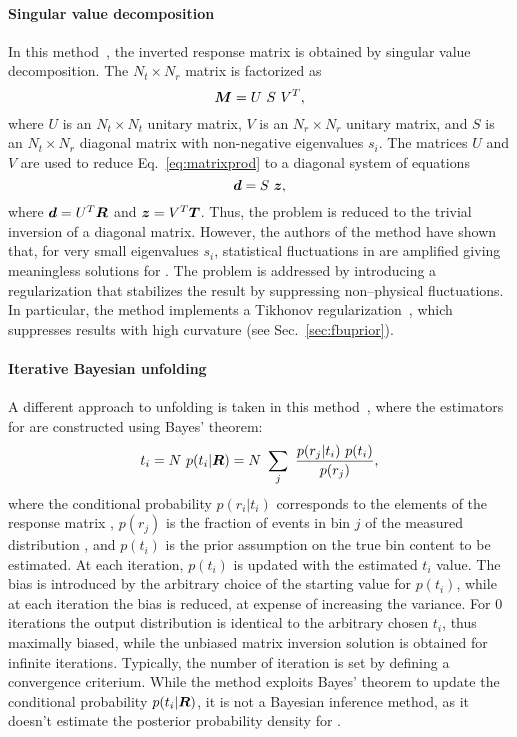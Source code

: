 \paragraph{Singular value decomposition}
In this method~\cite{Hocker:1995kb}, the inverted response matrix is
obtained by singular value decomposition. The $N_t\times N_r$ matrix
\TrasfMatrix{} is factorized as 
\begin{equation}
\boldsymbol{M}{} = U~S~V^T,
\end{equation}
where $U$ is an $N_t\times N_t$ unitary matrix, $V$ is an $N_r\times
N_r$ unitary matrix, and $S$ is an $N_t\times N_r$ diagonal matrix
with non-negative eigenvalues $s_i$.
The matrices $U$ and $V$ are used to reduce Eq.~\ref{eq:matrixprod}
to a diagonal system of equations
\begin{equation}
\boldsymbol{d} = S~\boldsymbol{z},
\end{equation}
where $\boldsymbol{d}=U^T\boldsymbol{R}{}$ and $\boldsymbol{z}=V^T\boldsymbol{T}{}$. Thus, the
problem is reduced to the trivial inversion of a diagonal matrix.
However, the authors of the method have shown that, for very small
eigenvalues $s_i$, statistical fluctuations in \Reco{} are amplified giving
meaningless solutions for \Truth{}. The problem is addressed by
introducing a regularization that stabilizes the result by suppressing
non--physical fluctuations. In particular, the method implements a
Tikhonov regularization~\cite{Tikhonov1943stability}, which suppresses
results with high curvature (see Sec.~\ref{sec:fbuprior}).
\paragraph{Iterative Bayesian unfolding}
A different approach to unfolding is taken in this
method~\cite{dagostini1995NIMPA}, where the estimators for \Truth{}
are constructed using Bayes' theorem:
\begin{equation}
t_i = N~p(t_i|\boldsymbol{R}{}) = N~\sum_j~\frac{p(r_j|t_i)~p(t_i)}{p(r_j)},
\end{equation} 
where the conditional probability $p(r_i|t_i)$ corresponds to the
elements of the response matrix \TrasfMatrix{}, $p(r_j)$ is the
fraction of events in bin $j$ of the measured distribution \Reco{},
and $p(t_i)$ is the prior assumption on the true bin content to be
estimated. At each iteration, $p(t_i)$ is updated with the estimated
$t_i$ value. The bias is introduced by the arbitrary choice of the
starting value for $p(t_i)$, while at each iteration the bias is
reduced, at expense of increasing the variance. For 0
iterations the output distribution is identical to the arbitrary
chosen $t_i$, thus maximally biased, while the unbiased matrix
inversion solution is obtained for infinite iterations. Typically, the
number of iteration is set by defining a convergence criterium. While
the method exploits Bayes' theorem to update the conditional
probability $p(t_i|\boldsymbol{R}{})$, it is not a Bayesian inference method,
as it doesn't estimate the posterior probability density for \Truth{}.

